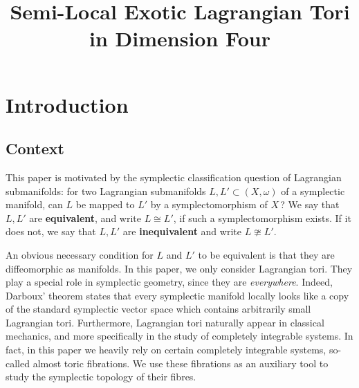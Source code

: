 \documentclass[AIF,Unicode,manuscript]{cedram}
\title{Semi-Local Exotic Lagrangian Tori in Dimension Four}%
\author{\firstname{Joé} \lastname{Brendel}}
\author{\firstname{Johannes} \lastname{Hauber}}
\author{\firstname{Joel} \lastname{Schmitz}}
\begin{document}
\maketitle

\begin{center}
\end{center}

\section{Introduction}

\subsection{Context}
\label{sec:intro_context}

This paper is motivated by the symplectic classification question of Lagrangian submanifolds: for two Lagrangian submanifolds $L,L' \subset (X,\omega)$ of a symplectic manifold, can $L$ be mapped to $L'$ by a symplectomorphism of $X\,$? We say that $L,L'$ are \textbf{equivalent}, and write $L \cong L'$, if such a symplectomorphism exists.
If it does not, we say that $L,L'$ are \textbf{inequivalent} and write $L \ncong L'$. 

An obvious necessary condition for $L$ and $L'$ to be equivalent is that they are diffeomorphic as manifolds.
In this paper, we only consider Lagrangian tori.
They play a special role in symplectic geometry, since they are \emph{everywhere}.
Indeed, Darboux' theorem states that every symplectic manifold locally looks like a copy of the standard symplectic vector space which contains arbitrarily small Lagrangian tori.
Furthermore, Lagrangian tori naturally appear in classical mechanics, and more specifically in the study of completely integrable systems.
In fact, in this paper we heavily rely on certain completely integrable systems, so-called almost toric fibrations. We use these fibrations as an auxiliary tool to study the symplectic topology of their fibres.
\end{document}
